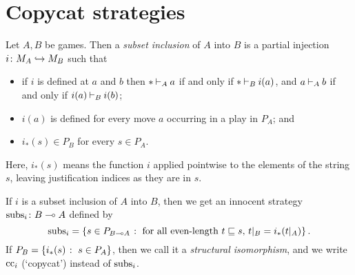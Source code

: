 \section{Copycat strategies}
\label{SecCopycat}

\begin{definition}
  Let $A,B$ be games.  
  Then a \emph{subset inclusion} of $A$ into $B$ is a partial injection $i\colon M_A\hookrightarrow M_B$ such that
  \begin{itemize}
    \item if $i$ is defined at $a$ and $b$ then $*\mathbin{\vdash}_A a$ if and only if $*\mathbin{\vdash}_B i(a)$, and $a\mathbin{\vdash}_A b$ if and only if $i(a)\mathbin{\vdash}_B i(b)$;
    \item $i(a)$ is defined for every move $a$ occurring in a play in $P_A$; and
    \item $i_*(s)\in P_B$ for every $s\in P_A$.
  \end{itemize}
  Here, $i_*(s)$ means the function $i$ applied pointwise to the elements of the string $s$, leaving justification indices as they are in $s$.

  If $i$ is a subset inclusion of $A$ into $B$, then we get an innocent strategy $\operatorname{subs}_i\colon B \multimap A$ defined by
  \[
    \operatorname{subs}_i = \{s\in P_{B\multimap A}\;\colon\;\text{for all even-length $t\sqsubseteq s$, $t\vert_B=i_*(t\vert_A)$}\}\,.
    \]
  If $P_B=\{i_*(s)\;\colon\; s\in P_A\}$, then we call it a \emph{structural isomorphism}, and we write $\operatorname{cc}_i$ (`copycat') instead of $\operatorname{subs}_i$.
\end{definition}


